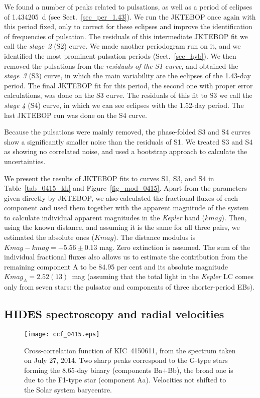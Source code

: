 \documentclass{aa}
\newcommand{\kep}{{\it Kepler }}
\begin{document}
We found a number of peaks related to pulsations, as well as a period of eclipses 
of 1.434205~d (see Sect.~\ref{sec_per_1.43}). We run the JKTEBOP once again with this 
period fixed, only to correct for these eclipses and improve the identification of 
frequencies of pulsation. The residuals of this intermediate JKTEBOP fit we call the 
{\it stage~2} (S2) curve. We made another periodogram run on it, and we identified 
the most prominent pulsation periods (Sect.~\ref{sec_hyb}). We then removed the 
pulsations from the {\it residuals of the S1 curve}, and obtained the {\it stage~3} 
(S3) curve, in which the main variability are the eclipses of the 1.43-day period. 
The final JKTEBOP fit for this period, the second one with proper error calculations, 
was done on the S3 curve. The residuals of this fit to S3 we call the {\it stage 4} 
(S4) curve, in which we can see eclipses with the 1.52-day period. The last JKTEBOP 
run was done on the S4 curve.

Because the pulsations were mainly removed, the phase-folded S3 and S4 curves show
a significantly smaller noise than the residuals of S1. We treated S3 and S4 as
showing no correlated noise, and used a bootstrap approach to calculate
the uncertainties. 

We present the results of JKTEBOP fits to curves S1, S3, and S4 in 
Table~\ref{tab_0415_kk} and Figure~\ref{fig_mod_0415}. Apart from the parameters 
given directly by JKTEBOP, we also calculated the fractional fluxes of each 
component and used them together with the apparent magnitude of the system 
to calculate individual apparent magnitudes in the \kep band ($kmag$). 
Then, using the known distance, and assuming it is the same for all three pairs, 
we estimated the absolute ones ($Kmag$). The distance modulus is 
$Kmag-kmag=-5.56\pm0.13$ mag. Zero extinction is assumed. The sum of
the individual fractional fluxes also allows us to estimate the contribution
from the remaining component A to be 84.95 per cent and its absolute magnitude
$Kmag_A=2.52(13)$~mag (assuming that the total light in the \kep LC comes
only from seven stars: the pulsator and components of three shorter-period EBs).


\subsection{HIDES spectroscopy and radial velocities}

\begin{figure}
\centering
\texttt{[image: ccf\_0415.eps]}
\caption{Cross-correlation function of KIC~4150611, from the
spectrum taken on July 27, 2014. Two sharp peaks correspond to
the G-type stars forming the 8.65-day binary (components Ba+Bb), 
the broad one is due to the F1-type star (component Aa). Velocities 
not shifted to the Solar system barycentre.}\label{fig_ccf_0415}
\end{figure}
\end{document}
